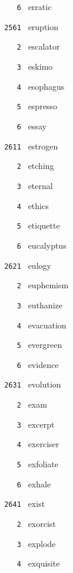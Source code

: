 \documentclass[11pt]{article}
\begin{document}
\begin{multicols}{6}
\noindent \texttt{ \ \ \ 6 } erratic  \par
\vspace{3mm}
\noindent \texttt{ 2561 } eruption  \par
\noindent \texttt{ \ \ \ 2 } escalator  \par
\noindent \texttt{ \ \ \ 3 } eskimo  \par
\noindent \texttt{ \ \ \ 4 } esophagus  \par
\noindent \texttt{ \ \ \ 5 } espresso  \par
\noindent \texttt{ \ \ \ 6 } essay  \par
\noindent \texttt{ 2611 } estrogen  \par
\noindent \texttt{ \ \ \ 2 } etching  \par
\noindent \texttt{ \ \ \ 3 } eternal  \par
\noindent \texttt{ \ \ \ 4 } ethics  \par
\noindent \texttt{ \ \ \ 5 } etiquette  \par
\noindent \texttt{ \ \ \ 6 } eucalyptus  \par
\vspace{3mm}
\noindent \texttt{ 2621 } eulogy  \par
\noindent \texttt{ \ \ \ 2 } euphemism  \par
\noindent \texttt{ \ \ \ 3 } euthanize  \par
\noindent \texttt{ \ \ \ 4 } evacuation  \par
\noindent \texttt{ \ \ \ 5 } evergreen  \par
\noindent \texttt{ \ \ \ 6 } evidence  \par
\vspace{3mm}
\noindent \texttt{ 2631 } evolution  \par
\noindent \texttt{ \ \ \ 2 } exam  \par
\noindent \texttt{ \ \ \ 3 } excerpt  \par
\noindent \texttt{ \ \ \ 4 } exerciser  \par
\noindent \texttt{ \ \ \ 5 } exfoliate  \par
\noindent \texttt{ \ \ \ 6 } exhale  \par
\vspace{3mm}
\noindent \texttt{ 2641 } exist  \par
\noindent \texttt{ \ \ \ 2 } exorcist  \par
\noindent \texttt{ \ \ \ 3 } explode  \par
\noindent \texttt{ \ \ \ 4 } exquisite  \par

\end{multicols}
\end{document}
